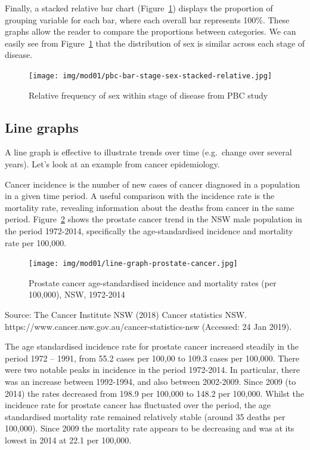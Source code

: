 \documentclass[
  a4paper,
]{memoir}
\begin{document}
Finally, a stacked relative bar chart (Figure~\ref{fig-bar-4}) displays
the proportion of grouping variable for each bar, where each overall bar
represents 100\%. These graphs allow the reader to compare the
proportions between categories. We can easily see from
Figure~\ref{fig-bar-4} that the distribution of sex is similar across
each stage of disease.

\begin{figure}[H]

{\centering \texttt{[image: img/mod01/pbc-bar-stage-sex-stacked-relative.jpg]}

}

\caption{\label{fig-bar-4}Relative frequency of sex within stage of
disease from PBC study}

\end{figure}

\hypertarget{line-graphs}{%
\subsection{Line graphs}\label{line-graphs}}

A line graph is effective to illustrate trends over time (e.g.~change
over several years). Let's look at an example from cancer epidemiology.

Cancer incidence is the number of new cases of cancer diagnosed in a
population in a given time period. A useful comparison with the
incidence rate is the mortality rate, revealing information about the
deaths from cancer in the same period. Figure~\ref{fig-line-1} shows the
prostate cancer trend in the NSW male population in the period
1972-2014, specifically the age-standardised incidence and mortality
rate per 100,000.

\begin{figure}[H]

{\centering \texttt{[image: img/mod01/line-graph-prostate-cancer.jpg]}

}

\caption{\label{fig-line-1}Prostate cancer age-standardised incidence
and mortality rates (per 100,000), NSW, 1972-2014}

\end{figure}

Source: The Cancer Institute NSW (2018) Cancer statistics NSW.
https://www.cancer.nsw.gov.au/cancer-statistics-nsw (Accessed: 24 Jan
2019).

The age standardised incidence rate for prostate cancer increased
steadily in the period 1972 -- 1991, from 55.2 cases per 100,00 to 109.3
cases per 100,000. There were two notable peaks in incidence in the
period 1972-2014. In particular, there was an increase between
1992-1994, and also between 2002-2009. Since 2009 (to 2014) the rates
decreased from 198.9 per 100,000 to 148.2 per 100,000. Whilst the
incidence rate for prostate cancer has fluctuated over the period, the
age standardised mortality rate remained relatively stable (around 35
deaths per 100,000). Since 2009 the mortality rate appears to be
decreasing and was at its lowest in 2014 at 22.1 per 100,000.
\end{document}
